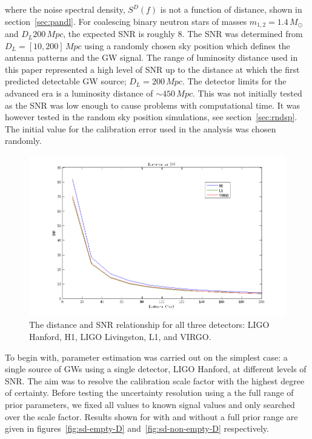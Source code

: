 \documentclass[12pt]{iopart}
\begin{document}
where the noise spectral density, $S^D(f)$ is not a function of distance, shown
in section~\ref{sec:pandl}. For coalescing binary neutron stars of masses
$m_{1,2} = 1.4\,M_{\odot}$ and  $D_{L}200\,Mpc$, the expected SNR is roughly 8.
The SNR was determined from $D_{L} = [10,200]\,Mpc$  using a randomly chosen
sky position which defines the antenna patterns and the GW signal. The range of
luminosity distance used in this paper represented a high level of SNR up to
the distance at which the first predicted detectable GW source; $D_{L} =
200\,Mpc$. The detector limits for the advanced era is a luminosity distance of
$\sim 450\,Mpc$. This was not initially tested as the SNR was low enough to
cause problems with computational time. It was however tested in the random sky
position simulations, see section~\ref{sec:rndsp}. The initial value for the
calibration error used in the analysis was chosen randomly.

\begin{figure}
  \centering
  \includegraphics[width = \textwidth]{DvsSNR-mult-det}
  \caption{The distance and SNR relationship for all three detectors:
LIGO Hanford, H1, LIGO Livingston, L1, and VIRGO.}
  \label{fig:distsnr}
\end{figure}

To begin with, parameter estimation was carried out on the simplest case: a
single source of GWs using a single detector, LIGO Hanford, at different levels
of SNR. The aim was to resolve the calibration scale factor with the highest
degree of certainty.  Before testing the uncertainty resolution using a the
full range of prior parameters, we fixed all values to known signal values and
only searched over the scale factor. Results shown for with and without a full
prior range are given in figures~\ref{fig:sd-empty-D}
and~\ref{fig:sd-non-empty-D} respectively.
\end{document}
